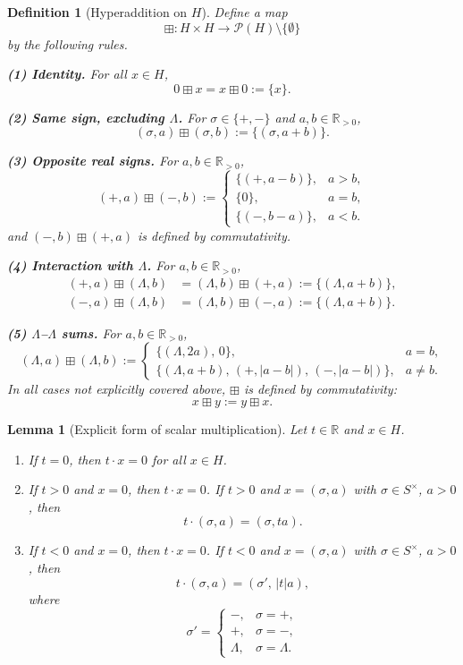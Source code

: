 \documentclass[10pt,a4paper]{amsart}
\newtheorem{definition}{Definition}
\newtheorem{lemma}{Lemma}
\newcommand{\Hnum}{H}                      %
\newcommand{\R}{\mathbb{R}}
\newcommand{\Rp}{\mathbb{R}_{>0}}
\newcommand{\Snon}{S^{\times}}             %
\newcommand{\op}{\boxplus}                 %
\begin{document}
\begin{definition}[Hyperaddition on $\Hnum$]\label{def:H-hyperadd}
Define a map
\[
  \op : \Hnum\times\Hnum
  \longrightarrow \mathcal{P}(\Hnum)\setminus\{\emptyset\}
\]
by the following rules.

\smallskip\noindent
\textbf{(1) Identity.} For all $x\in\Hnum$,
\[
  0\op x = x\op 0 := \{x\}.
\]

\smallskip\noindent
\textbf{(2) Same sign, excluding $\Lambda$.} For $\sigma\in\{+,-\}$ and
$a,b\in\Rp$,
\[
  (\sigma,a)\op(\sigma,b)
  := \{(\sigma,a+b)\}.
\]

\smallskip\noindent
\textbf{(3) Opposite real signs.} For $a,b\in\Rp$,
\[
  (+,a)\op(-,b)
  :=
  \begin{cases}
    \{(+,a-b)\}, & a>b,\\[2pt]
    \{0\},       & a=b,\\[2pt]
    \{(-,b-a)\}, & a<b.
  \end{cases}
\]
and $(-,b)\op(+,a)$ is defined by commutativity.

\smallskip\noindent
\textbf{(4) Interaction with $\Lambda$.} For $a,b\in\Rp$,
\begin{align*}
  (+,a)\op(\Lambda,b)
  &= (\Lambda,b)\op(+,a)
   := \{(\Lambda,a+b)\},\\[2pt]
  (-,a)\op(\Lambda,b)
  &= (\Lambda,b)\op(-,a)
   := \{(\Lambda,a+b)\}.
\end{align*}

\smallskip\noindent
\textbf{(5) $\Lambda$--$\Lambda$ sums.} For $a,b\in\Rp$,
\[
  (\Lambda,a)\op(\Lambda,b)
  :=
  \begin{cases}
    \{(\Lambda,2a),\,0\}, & a=b,\\[2pt]
    \{(\Lambda,a+b),\, (+,|a-b|),\, (-,|a-b|)\}, & a\ne b.
  \end{cases}
\]
\smallskip\noindent
In all cases not explicitly covered above, $\op$ is defined by
commutativity:
\[
  x\op y := y\op x.
\]
\end{definition}

\begin{lemma}[Explicit form of scalar multiplication]
\label{lem:scalar-explicit}
Let $t\in\R$ and $x\in\Hnum$.
\begin{enumerate}
  \item If $t=0$, then $t\cdot x = 0$ for all $x\in\Hnum$.
  \item If $t>0$ and $x=0$, then $t\cdot x=0$.  If
        $t>0$ and $x=(\sigma,a)$ with $\sigma\in\Snon$, $a>0$, then
  \[
    t\cdot(\sigma,a) = (\sigma,ta).
  \]
  \item If $t<0$ and $x=0$, then $t\cdot x=0$.  If
        $t<0$ and $x=(\sigma,a)$ with $\sigma\in\Snon$, $a>0$, then
  \[
    t\cdot(\sigma,a) =
    (\sigma',\,|t|a),
  \]
  where
  \[
    \sigma' =
    \begin{cases}
      -,       & \sigma=+,\\
      +,       & \sigma=-,\\
      \Lambda, & \sigma=\Lambda.
    \end{cases}
  \]
\end{enumerate}
\end{lemma}
\end{document}
